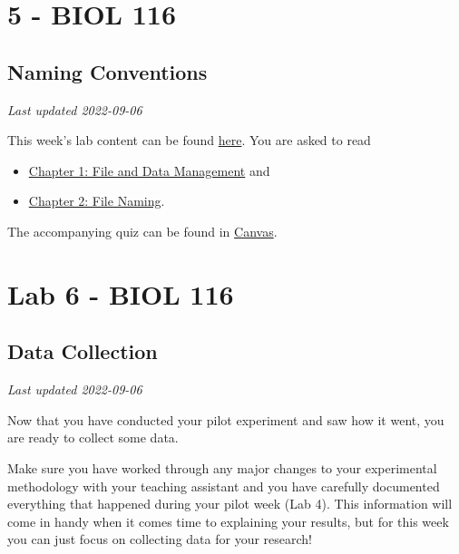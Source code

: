 \documentclass[
]{book}
\providecommand{\tightlist}{%
  \setlength{\itemsep}{0pt}\setlength{\parskip}{0pt}}
\begin{document}
\hypertarget{part-5---biol-116}{%
\part*{5 - BIOL 116}\label{part-5---biol-116}}

\hypertarget{naming-conventions}{%
\chapter*{Naming Conventions}\label{naming-conventions}}

\emph{Last updated 2022-09-06}

This week's lab content can be found \href{https://ubco-biology.github.io/Procedures-and-Guidelines/file-and-data-management.html}{here}. You are asked to read

\begin{itemize}
\tightlist
\item
  \href{https://ubco-biology.github.io/Procedures-and-Guidelines/file-and-data-management.html}{Chapter 1: File and Data Management} and
\item
  \href{https://ubco-biology.github.io/Procedures-and-Guidelines/file-naming.html}{Chapter 2: File Naming}.
\end{itemize}

The accompanying quiz can be found in \href{https://canvas.ubc.ca}{Canvas}.

\hypertarget{part-lab-6---biol-116}{%
\part*{Lab 6 - BIOL 116}\label{part-lab-6---biol-116}}

\hypertarget{data-collection}{%
\chapter*{Data Collection}\label{data-collection}}

\emph{Last updated 2022-09-06}

Now that you have conducted your pilot experiment and saw how it went, you are ready to collect some data.

Make sure you have worked through any major changes to your experimental methodology with your teaching assistant and you have carefully documented everything that happened during your pilot week (Lab 4). This information will come in handy when it comes time to explaining your results, but for this week you can just focus on collecting data for your research!
\end{document}

